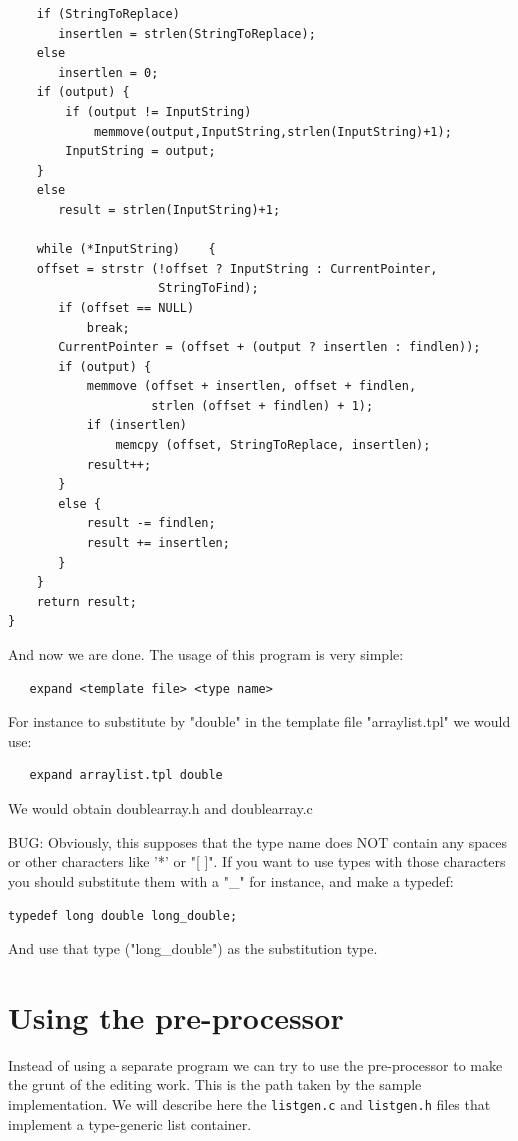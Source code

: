 \documentclass[12pt,a4paper,openany]{memoir} %
\begin{document}
{{\begin{verbatim}
    if (StringToReplace)
       insertlen = strlen(StringToReplace);
    else
       insertlen = 0;
    if (output) {
        if (output != InputString)
            memmove(output,InputString,strlen(InputString)+1);
        InputString = output;
    }
    else
       result = strlen(InputString)+1;

    while (*InputString)    {
    offset = strstr (!offset ? InputString : CurrentPointer,
                     StringToFind);
       if (offset == NULL)
           break;
       CurrentPointer = (offset + (output ? insertlen : findlen));
       if (output) {
           memmove (offset + insertlen, offset + findlen,
                    strlen (offset + findlen) + 1);
           if (insertlen)
               memcpy (offset, StringToReplace, insertlen);
           result++;
       }
       else {
           result -= findlen;
           result += insertlen;
       }
    }
    return result;
}
\end{verbatim}

And now we are done. The usage of this program is very simple:
 \begin{verbatim}
   expand <template file> <type name>
\end{verbatim}

For instance to substitute by "double" in the template file "arraylist.tpl" we would use:

\begin{verbatim}
   expand arraylist.tpl double
\end{verbatim}

We would obtain doublearray.h and doublearray.c

BUG: Obviously, this supposes that the type name does NOT contain  any spaces or other characters like '*' or "[  ]". If you want to use types with 
those characters you should substitute them with a "\_" for instance, and make a typedef:

\texttt{typedef long double long\_double;}

And use that type ("long\_double") as the substitution type.
\section{Using the pre-processor}
Instead of using a separate program we can try to use the pre-processor to make the grunt of the editing work. This is the path taken by the
sample implementation. We will describe here the \verb,listgen.c, and \verb,listgen.h, files that implement a type-generic list container.

}}
\end{document}

